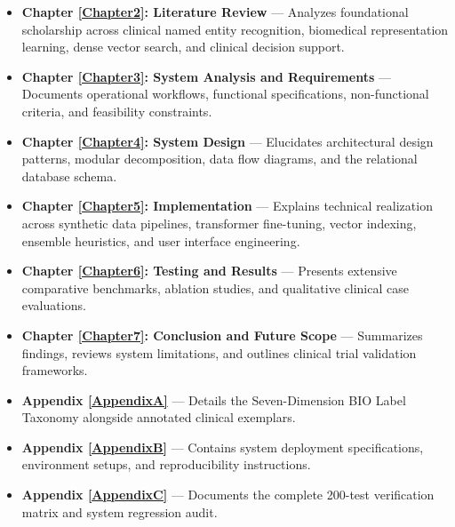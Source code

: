 \begin{itemize}
  \item \textbf{Chapter \ref{Chapter2}: Literature Review} --- Analyzes foundational scholarship across clinical named entity recognition, biomedical representation learning, dense vector search, and clinical decision support.
  \item \textbf{Chapter \ref{Chapter3}: System Analysis and Requirements} --- Documents operational workflows, functional specifications, non-functional criteria, and feasibility constraints.
  \item \textbf{Chapter \ref{Chapter4}: System Design} --- Elucidates architectural design patterns, modular decomposition, data flow diagrams, and the relational database schema.
  \item \textbf{Chapter \ref{Chapter5}: Implementation} --- Explains technical realization across synthetic data pipelines, transformer fine-tuning, vector indexing, ensemble heuristics, and user interface engineering.
  \item \textbf{Chapter \ref{Chapter6}: Testing and Results} --- Presents extensive comparative benchmarks, ablation studies, and qualitative clinical case evaluations.
  \item \textbf{Chapter \ref{Chapter7}: Conclusion and Future Scope} --- Summarizes findings, reviews system limitations, and outlines clinical trial validation frameworks.
  \item \textbf{Appendix \ref{AppendixA}} --- Details the Seven-Dimension BIO Label Taxonomy alongside annotated clinical exemplars.
  \item \textbf{Appendix \ref{AppendixB}} --- Contains system deployment specifications, environment setups, and reproducibility instructions.
  \item \textbf{Appendix \ref{AppendixC}} --- Documents the complete 200-test verification matrix and system regression audit.
\end{itemize}
